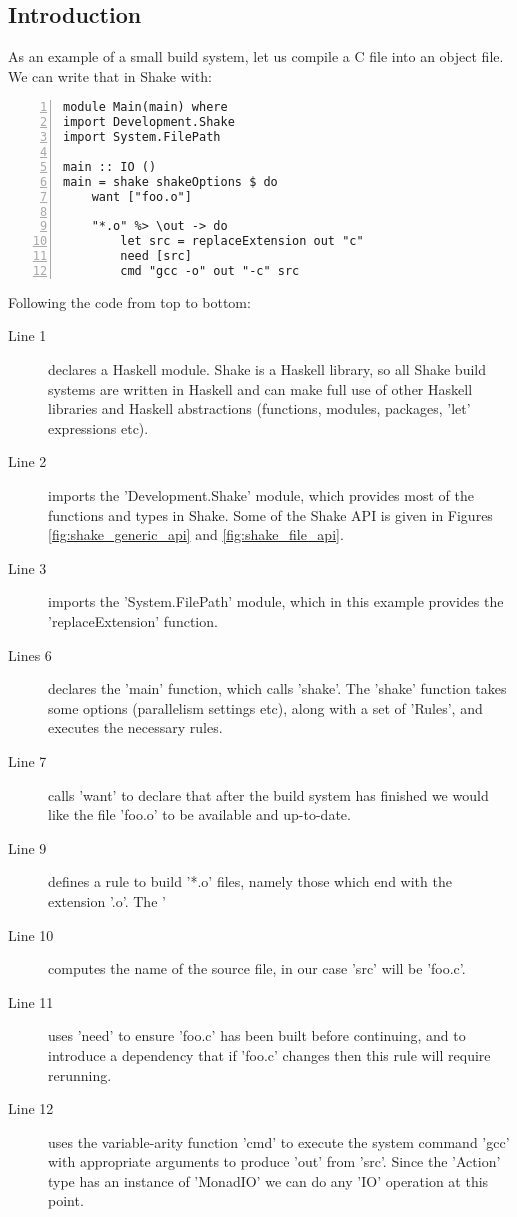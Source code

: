 \subsection{Introduction}

As an example of a small build system, let us compile a C file into an object file. We can write that in Shake with:

\begin{lstlisting}[numbers=left,xleftmargin=2em,framexleftmargin=1.5em]
module Main(main) where
import Development.Shake
import System.FilePath

main :: IO ()
main = shake shakeOptions $ do
    want ["foo.o"]

    "*.o" %> \out -> do
        let src = replaceExtension out "c"
        need [src]
        cmd "gcc -o" out "-c" src
\end{lstlisting}

Following the code from top to bottom:

\begin{description}
\item[Line 1] declares a Haskell module. Shake is a Haskell library, so all Shake build systems are written in Haskell and can make full use of other Haskell libraries and Haskell abstractions (functions, modules, packages, \lst'let' expressions etc).
\item[Line 2] imports the \lst'Development.Shake' module, which provides most of the functions and types in Shake. Some of the Shake API is given in Figures \ref{fig:shake_generic_api} and \ref{fig:shake_file_api}.
\item[Line 3] imports the \lst'System.FilePath' module, which in this example provides the \lst'replaceExtension' function.
\item[Lines 6] declares the \lst'main' function, which calls \lst'shake'. The \lst'shake' function takes some options (parallelism settings etc), along with a set of \lst'Rules', and executes the necessary rules.
\item[Line 7] calls \lst'want' to declare that after the build system has finished we would like the file \lst'foo.o' to be available and up-to-date.
\item[Line 9] defines a rule to build \lst'*.o' files, namely those which end with the extension \lst'.o'. The \lst'%
\item[Line 10] computes the name of the source file, in our case \lst'src' will be \lst'foo.c'.
\item[Line 11] uses \lst'need' to ensure \lst'foo.c' has been built before continuing, and to introduce a dependency that if \lst'foo.c' changes then this rule will require rerunning.
\item[Line 12] uses the variable-arity function \lst'cmd' to execute the system command \lst'gcc' with appropriate arguments to produce \lst'out' from \lst'src'. Since the \lst'Action' type has an instance of \lst'MonadIO' we can do any \lst'IO' operation at this point.
\end{description}

